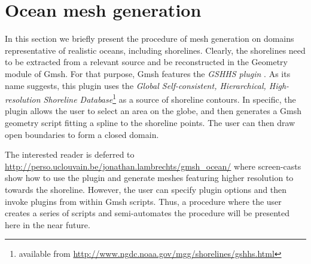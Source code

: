 \section{Ocean mesh generation}
\label{sect:ocean_mesh_generation}
In this section we briefly present the procedure of mesh generation on domains representative of realistic oceans, including shorelines. Clearly, the shorelines need to be extracted from a relevant source and be reconstructed in the Geometry module of Gmsh. For that purpose, Gmsh features the \emph{GSHHS plugin} \citep{lambrechts_et_al:2008}. As its name suggests, this plugin uses the \emph{Global Self-consistent, Hierarchical, High-resolution Shoreline Database}\footnote{available from \url{http://www.ngdc.noaa.gov/mgg/shorelines/gshhs.html}} \citep{wessel_smith:1996} as a source of shoreline contours. In specific, the plugin allows the user to select an area on the globe, and then generates a Gmsh geometry script fitting a spline to the shoreline points. The user can then draw open boundaries to form a closed domain. 
\par
The interested reader is deferred to \url{http://perso.uclouvain.be/jonathan.lambrechts/gmsh_ocean/} where screen-casts show how to use the plugin and generate meshes featuring higher resolution to towards the shoreline. However, the user can specify plugin options and then invoke plugins from within Gmsh scripts. Thus, a procedure where the user creates a series of scripts and semi-automates the procedure will be presented here in the near future.

